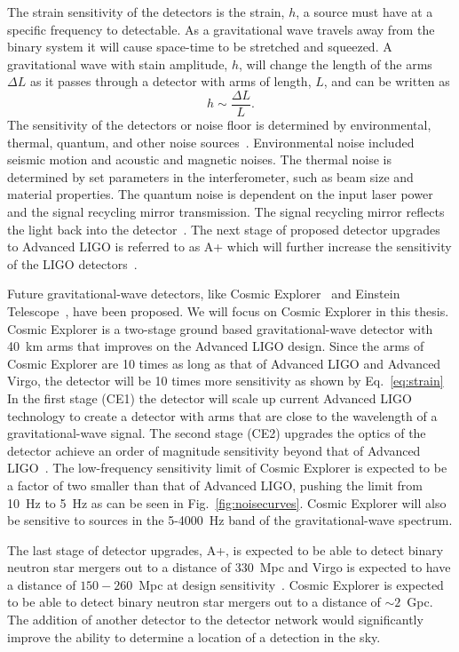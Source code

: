 The strain sensitivity of the detectors is the strain, $h$, a source must have at a specific frequency to detectable. As a gravitational wave travels away from the binary system it will cause space-time to be stretched and squeezed. A gravitational wave with stain amplitude, $h$, will change the length of the arms $\Delta L$ as it passes through a detector with arms of length, $L$, and can be written as
\begin{equation}\label{eq:strain}
    h \sim \frac{\Delta L}{L}.
\end{equation}
The sensitivity of the detectors or noise floor is determined by environmental, thermal, quantum, and other noise sources~\cite{Martynov:2016fzi}. Environmental noise included seismic motion and acoustic and magnetic noises. The thermal noise is determined by set parameters in the interferometer, such as beam size and material properties. The quantum noise is dependent on the input laser power and the signal recycling mirror transmission. The signal recycling mirror reflects the light back into the detector~\cite{Meers:1988wp}. The next stage of proposed detector upgrades to Advanced LIGO is referred to as A+ which will further increase the sensitivity of the LIGO detectors~\cite{A+}. 

Future gravitational-wave detectors, like Cosmic Explorer~\cite{Reitze:2019iox} and Einstein Telescope~\cite{Punturo:2010zz}, have been proposed. We will focus on Cosmic Explorer in this thesis. Cosmic Explorer is a two-stage ground based gravitational-wave detector with 40~km arms that improves on the Advanced LIGO design. Since the arms of Cosmic Explorer are 10 times as long as that of Advanced LIGO and Advanced Virgo, the detector will be 10 times more sensitivity as shown by Eq.~\ref{eq:strain} In the first stage (CE1) the detector will scale up current Advanced LIGO technology to create a detector with arms that are close to the wavelength of a gravitational-wave signal. The second stage (CE2) upgrades the optics of the detector achieve an order of magnitude sensitivity beyond that of Advanced LIGO~\cite{Reitze:2019dyk}. The low-frequency sensitivity limit of Cosmic Explorer is expected to be a factor of two smaller than that of Advanced LIGO, pushing the limit from 10~Hz to 5~Hz as can be seen in Fig.~\ref{fig:noisecurves}. Cosmic Explorer will also be sensitive to sources in the 5-4000~Hz band of the gravitational-wave spectrum. 

The last stage of detector upgrades, A+, is expected to be able to detect binary neutron star mergers out to a distance of 330~Mpc and Virgo is expected to have a distance of $150-260$~Mpc at design sensitivity~\cite{Aasi:2013wya}. Cosmic Explorer is expected to be able to detect binary neutron star mergers out to a distance of $\sim 2$~Gpc. The addition of another detector to the detector network would significantly improve the ability to determine a location of a detection in the sky.

